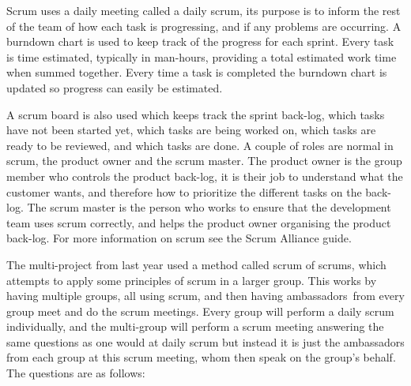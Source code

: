 Scrum uses a daily meeting called a daily scrum, its purpose is to inform the rest of the team of how each task is progressing, and if any problems are occurring.
A burndown chart is used to keep track of the progress for each sprint. 
Every task is time estimated, typically in man-hours, providing a total estimated work time when summed together. 
Every time a task is completed the burndown chart is updated so progress can easily be estimated.

A scrum board is also used which keeps track the sprint back-log, which tasks have not been started yet, which tasks are being worked on, which tasks are ready to be reviewed, and which tasks are done.
A couple of roles are normal in scrum, the product owner and the scrum master.
The product owner is the group member who controls the product back-log, it is their job to understand what the customer wants, and therefore how to prioritize the different tasks on the back-log.
The scrum master is the person who works to ensure that the development team uses scrum correctly, and helps the product owner organising the product back-log.
For more information on scrum see the Scrum Alliance guide. \cite{scrum}  

\bigskip
The multi-project from last year used a method called scrum of scrums, which attempts to apply some principles of scrum in a larger group.
This works by having multiple groups, all using scrum, and then having ambassadors\ from every group meet and do the scrum meetings. 
Every group will perform a daily scrum individually, and the multi-group will perform a scrum meeting answering the same questions as one would at daily scrum but instead it is just the ambassadors from each group at this scrum meeting, whom then speak on the group's behalf.
The questions are as follows:

